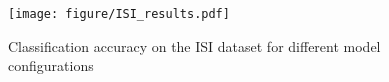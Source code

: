\documentclass[10pt,twocolumn,letterpaper]{article}
\begin{document}
\begin{figure}
\texttt{[image: figure/ISI\_results.pdf]}
\caption{Classification accuracy on the ISI dataset for different model configurations}
\label{fig:ISI}
\end{figure}
\end{document}
